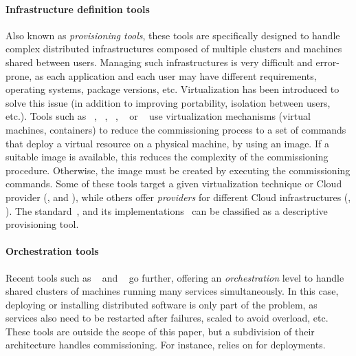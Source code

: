 \paragraph{Infrastructure definition tools}
Also known as \emph{provisioning tools}, these tools are specifically
designed to handle complex distributed infrastructures composed of
multiple clusters and machines shared between users. Managing such
infrastructures is very difficult and error-prone, as each application
and each user may have different requirements, operating systems,
package versions, etc. Virtualization has been introduced to solve
this issue (in addition to improving portability, isolation between
users, etc.). Tools such as \docker~\cite{docker:web},
\terraform~\cite{terraform:web}, \juju~\cite{juju:web},
\cloudformation~\cite{cloudf:web} or \heat~\cite{heat:web} use
virtualization mechanisms (\eg virtual machines, containers) to reduce
the commissioning process to a set of commands that deploy a virtual
resource on a physical machine, by using an image. If a suitable image
is available, this reduces the complexity of the
commissioning procedure. Otherwise, the image must be created by
executing the commissioning commands. Some of these tools target a given virtualization
technique or Cloud provider (\eg \docker, \cloudformation and
\heat), while others offer \emph{providers} for different
Cloud infrastructures (\eg \terraform, \juju). The \tosca
standard~\cite{tosca:web}, and its
implementations~\cite{Binz2013,cloudify:web,opentosca:web,8599581} can
be classified as a descriptive provisioning tool.

\paragraph{Orchestration tools}
Recent tools such as \kubernetes~\cite{kubernetes:web} and
\dockerswarm~\cite{dockerswarm:web} go further, offering an
\emph{orchestration} level to handle shared clusters of machines
running many services simultaneously. In this case, deploying or
installing distributed software is only part of the problem, as
services also need to be restarted after failures, scaled to avoid
overload, etc. These tools are outside the scope of this paper, but a
subdivision of their architecture handles commissioning. For instance,
\kubernetes relies on \docker for deployments.

